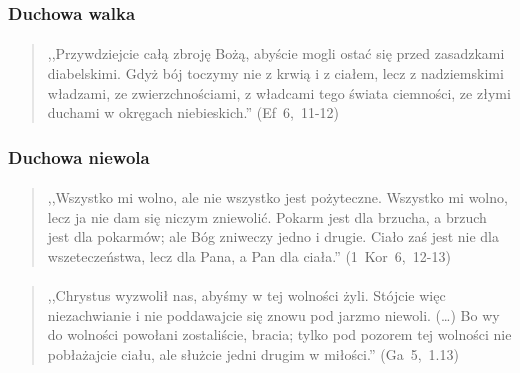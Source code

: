 \documentclass[10pt,a4paper,oneside]{article}
\begin{document}
\subsubsection{Duchowa walka}
\paragraph{}
\begin{quote}
,,Przywdziejcie całą zbroję Bożą, abyście mogli ostać się przed zasadzkami diabelskimi. Gdyż bój toczymy nie z krwią i z ciałem, lecz z nadziemskimi władzami, ze zwierzchnościami, z władcami tego świata ciemności, ze złymi duchami w okręgach niebieskich.'' \mbox{(Ef 6, 11-12)}
\end{quote}
\subsubsection{Duchowa niewola}
\paragraph{}
\begin{quote}
,,Wszystko mi wolno, ale nie wszystko jest pożyteczne. Wszystko mi wolno, lecz ja nie dam się niczym zniewolić. Pokarm jest dla brzucha, a brzuch jest dla pokarmów; ale Bóg zniweczy jedno i drugie. Ciało zaś jest nie dla wszeteczeństwa, lecz dla Pana, a Pan dla ciała.'' \mbox{(1 Kor 6, 12-13)}
\end{quote}
\paragraph{}
\begin{quote}
,,Chrystus wyzwolił nas, abyśmy w tej wolności żyli. Stójcie więc niezachwianie i nie poddawajcie się znowu pod jarzmo niewoli. (\ldots) Bo wy do wolności powołani zostaliście, bracia; tylko pod pozorem tej wolności nie pobłażajcie ciału, ale służcie jedni drugim w miłości.'' \mbox{(Ga 5, 1.13)}
\end{quote}
\end{document}
